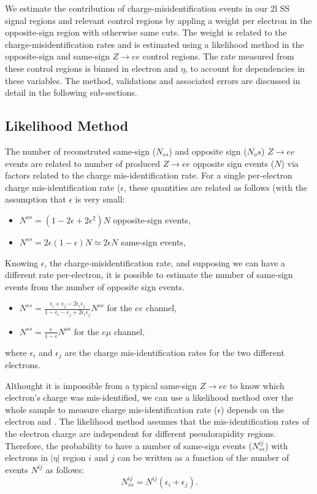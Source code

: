 We estimate the contribution of charge-misidentification events in our 2l SS signal regions and relevant control regions by appling a weight per electron in the opposite-sign region with otherwise same cuts. The weight is related to the charge-misidentification rates and is estimated using a likelihood method in the opposite-sign and same-sign $Z\rightarrow ee$ control regions. The rate measured from these control regions is binned in electron \pt and $\eta$, to account for dependencies in these variables. The method, validations and associated errors are discussed in detail in the following sub-sections.


\subsection{Likelihood Method}

The number of reconstruted same-sign ($N_{ss}$) and opposite sign ($N_os$) $Z\rightarrow ee$ events are related to number of produced $Z\rightarrow ee$ opposite sign events ($N$) via factors related to the charge mis-identification rate. For a single per-electron charge mis-identification rate ($\epsilon$, these quantities are related as follows (with the assumption that $\epsilon$ is very small: 

\begin{itemize}
\item $N^{os} = (1-2\epsilon+2\epsilon^2) N$ opposite-sign events,
\item $N^{ss} = 2\epsilon(1-\epsilon) N \simeq 2\epsilon N$ same-sign events,
\end{itemize}


Knowing $\epsilon$, the charge-misidentification rate, and supposing we can have a different rate per-electron, it is possible to estimate the number of same-sign events from the number of opposite sign events.

\begin{itemize}
\item $N^{ss} = \frac{\epsilon_i +\epsilon_j -2\epsilon_i \epsilon_j}{1-\epsilon_i -\epsilon_j +2\epsilon_i \epsilon_j} N^{os}$ for the $ee$ channel,
\item $N^{ss} = \frac{\epsilon}{1-\epsilon} N^{os}$ for the $e\mu$ channel,
\end{itemize}
where $\epsilon_i$ and $\epsilon_j$ are the charge mis-identification rates for the two
different electrons.


Althought it is impossible from a typical same-sign $Z\rightarrow ee$ to know which electron's charge was mis-identified, we can use a likelihood method over the whole sample to measure charge mis-identification rate ($\epsilon$) depends on the electron \pt and \eta.  The likelihood method assumes that  the mis-identification rates of the electron charge are independent for different pseudorapidity regions. Therefore, the probability to have a number of same-sign events ($N^{ij}_{ss}$) with electrons in $|\eta|$ region $i$ and $j$ can be written as a function of the number of events $N^{ij}$ as follows:
\begin{equation}
N^{ij}_{ss}=N^{ij}(\epsilon_i+\epsilon_j).
\end{equation}


